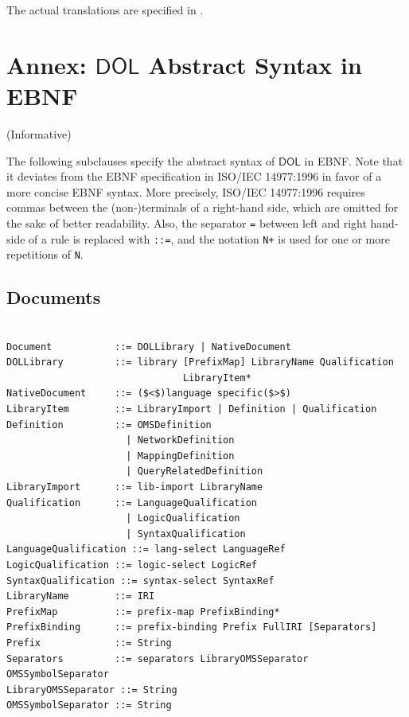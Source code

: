 \documentclass[10pt,fleqn,final]{scrreprt}
\makeatletter
\newcommand*\CommentAuthor{}
\renewcommand*\CommentAuthor{#1}}
\newcommand*\CommentDate{}
\renewcommand*\CommentDate{#1}}
\newcommand*\CommentId{}
\renewcommand*\CommentId{#1}}
\newcommand*\CommentType{}
\renewcommand*\CommentType{#1}}
\newcommand*{\SetCommentColorByType}[1]{%
\edef\localType{{#1}}%
\expandafter\ifstrequal\localType{q-aut}{\colorlet{CommentColor}{red}}{%
\expandafter\ifstrequal\localType{q-all}{\colorlet{CommentColor}{orange}}{%
\expandafter\ifstrequal\localType{todo}{\colorlet{CommentColor}{orange}}{%
\expandafter\ifstrequal\localType{fyi}{\colorlet{CommentColor}{lightgray}}{%
\colorlet{CommentColor}{yellow}}}}}}
\newcommand*{\SetCommentPrefixByType}[1]{%
\edef\localType{{#1}}%
\expandafter\@ifmtarg\localType{%
\edef\CommentPrefix{}%
}{%
\caseupper[q]{#1}%
\edef\CommentPrefix{\thestring: }%
}}
\newcommand*{\initComment}[1]{%
\setkeys{Comment}{#1}%
\SetCommentColorByType{\CommentType}%
\relax%
\SetCommentPrefixByType{\CommentType}%
\relax%
}
\newcommand*{\todonote}[2][]{%
\initComment{#1}%
\pdfcomment[author=\CommentAuthor,color=CommentColor,date=\CommentDate,id=\CommentId]{%
\CommentPrefix
#2}}
\renewcommand*{\todonote}[2][]{%
\initComment{#1}%
\ednote{\CommentPrefix #2}}
\newcommand*{\syntax}[1]{\texttt{#1}}
\newcommand*{\IS}{OMG Specification\xspace}
\newcommand*{\DOL}{\ensuremath{\mathsf{DOL}}\xspace}
\newcommand{\informative}[0]{{\begin{center}{\Large{(Informative})}\end{center}} \bigskip}
\newcommand{\sclause}[1]{\section{#1}}
\newcommand{\nisref}[1]{#1}
\newcommand{\infannex}[1]{ \chapter{Annex: #1}  \informative }
\newenvironment{definitions}[0]{\medskip }{}
\makeatother
\begin{document}
\begin{definitions}
The actual translations are specified in \cite{OntoGraph}.






\infannex{\DOL Abstract Syntax in EBNF}
\label{a:EBNF}


The following subclauses specify the abstract syntax of \DOL in EBNF. Note that it deviates from the EBNF specification in
 \nisref{ISO/IEC 14977:1996} in favor of a more concise
EBNF syntax. More precisely, \nisref{ISO/IEC 14977:1996} requires commas between the (non-)terminals of a right-hand side, which are omitted 
for the sake of better readability. Also, the separator \syntax{=}
between left and right hand-side of a rule is replaced with \syntax{::=}, and 
 the notation \syntax{N+} is used 
for one or more repetitions of \syntax{N}.


\sclause{Documents}\label{e:libraries}
\begin{lstlisting}[language=ebnf,escapeinside={()}]  % abstract syntax

Document           ::= DOLLibrary | NativeDocument
DOLLibrary         ::= library [PrefixMap] LibraryName Qualification
                               LibraryItem*
NativeDocument     ::= ($<$)language specific($>$) 
LibraryItem        ::= LibraryImport | Definition | Qualification
Definition         ::= OMSDefinition
                     | NetworkDefinition
                     | MappingDefinition
                     | QueryRelatedDefinition
LibraryImport      ::= lib-import LibraryName
Qualification      ::= LanguageQualification
                     | LogicQualification
                     | SyntaxQualification
LanguageQualification ::= lang-select LanguageRef
LogicQualification ::= logic-select LogicRef
SyntaxQualification ::= syntax-select SyntaxRef
LibraryName        ::= IRI
PrefixMap          ::= prefix-map PrefixBinding*
PrefixBinding      ::= prefix-binding Prefix FullIRI [Separators]
Prefix             ::= String
Separators         ::= separators LibraryOMSSeparator OMSSymbolSeparator
LibraryOMSSeparator ::= String
OMSSymbolSeparator ::= String
\end{lstlisting}


\end{definitions}
\end{document}
